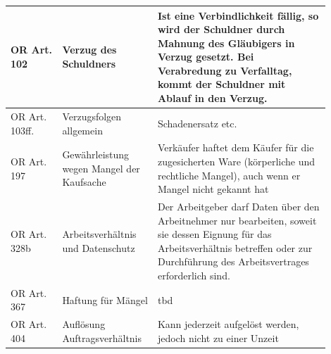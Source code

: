 \documentclass{report}
\theoremstyle{definition}
\theoremstyle{example}
\begin{document}
\begin{tabular}[h]{p{0.15\linewidth}|p{0.25\linewidth}|p{0.50\linewidth}}
   \hline
   OR Art. 102 & Verzug des Schuldners & Ist eine Verbindlichkeit fällig, so wird der Schuldner durch Mahnung des Gläubigers in Verzug gesetzt. Bei Verabredung zu Verfalltag, kommt der Schuldner mit Ablauf in den Verzug.\\
   \hline
   OR Art. 103ff. & Verzugsfolgen allgemein & Schadenersatz etc.\\
   \hline
   OR Art. 197 & Gewährleistung wegen Mangel der Kaufsache & Verkäufer haftet dem Käufer für die zugesicherten Ware (körperliche und rechtliche Mangel), auch wenn er Mangel nicht gekannt hat \\
   \hline
   OR Art. 328b & Arbeitsverhältnis und Datenschutz & Der Arbeitgeber darf Daten über den Arbeitnehmer nur bearbeiten, soweit sie dessen Eignung für das Arbeitsverhältnis betreffen oder zur Durchführung des Arbeitsvertrages erforderlich sind. \\
   \hline
   OR Art. 367 & Haftung für Mängel & tbd \\
   \hline
   OR Art. 404 & Auflösung Auftragsverhältnis & Kann jederzeit aufgelöst werden, jedoch nicht zu einer Unzeit \\
   \hline
\end{tabular}
\end{document}
